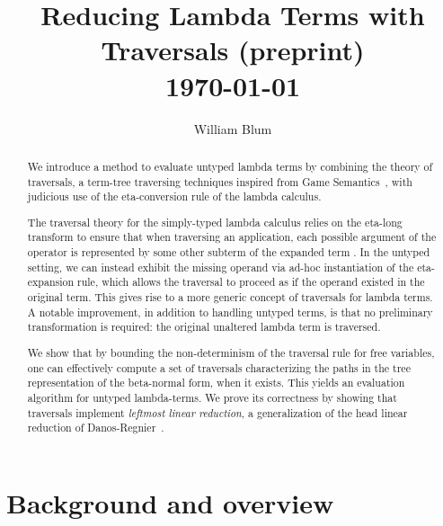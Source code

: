 \documentclass{elsarticle}
\author{William Blum}
\title{Reducing Lambda Terms with Traversals (preprint)
\\ \vspace*{1em}
\today}
\theoremstyle{plain}
\theoremstyle{definition}
\theoremstyle{remark}
\begin{document}
\begin{abstract}
    We introduce a method to evaluate untyped lambda terms by combining the theory of traversals, a term-tree traversing techniques inspired from Game Semantics~\cite{Ong2006,BlumPhd}, with judicious use of the eta-conversion rule of the lambda calculus.

    The traversal theory for the simply-typed lambda calculus relies on the eta-long transform to ensure that when traversing an application, each possible argument of the operator is represented by some other subterm of the expanded term \cite{BlumPhd, Ong2006}. In the untyped setting, we can instead exhibit the missing operand via ad-hoc instantiation of the eta-expansion rule, which allows the traversal to proceed as if the operand existed in the original term. This gives rise to a more generic concept of traversals for lambda terms. A notable improvement, in addition to handling untyped terms, is that no preliminary transformation is required: the original unaltered lambda term is traversed.


    We show that by bounding the non-determinism of the traversal rule for free variables, one can effectively compute a set of traversals characterizing the paths in the tree representation of the beta-normal form, when it exists. This yields an evaluation algorithm for untyped lambda-terms. We prove its correctness by showing  that traversals implement \emph{leftmost linear reduction}, a generalization of the head linear reduction of Danos-Regnier~\cite{danos-head,danosherbelinregnier1996}.
\end{abstract}

\maketitle

\tableofcontents

\section{Background and overview}
\end{document}
